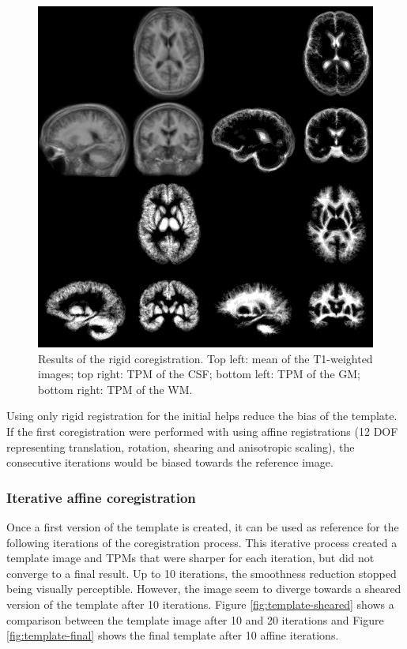 \begin{figure}
  \includegraphics[width=\textwidth]{figures/rigid_template_collage}
  \caption{Results of the rigid coregistration. Top left: mean of the T1-weighted images; top right: TPM of the CSF; bottom left: TPM of the GM; bottom right: TPM of the WM.}
  \label{fig:template-rigid}
\end{figure}

Using only rigid registration for the initial helps reduce the bias of the template. If the first coregistration were performed with using affine registrations (12 DOF representing translation, rotation, shearing and anisotropic scaling), the consecutive iterations would be biased towards the reference image.


\subsubsection{Iterative affine coregistration}
Once a first version of the template is created, it can be used as reference for the following iterations of the coregistration process. This iterative process created a template image and TPMs that were sharper for each iteration, but did not converge to a final result. Up to 10 iterations, the smoothness reduction stopped being visually perceptible. However, the image seem to diverge towards a sheared version of the template after 10 iterations. Figure \ref{fig:template-sheared} shows a comparison between the template image after 10 and 20 iterations and Figure \ref{fig:template-final} shows the final template after 10 affine iterations.


